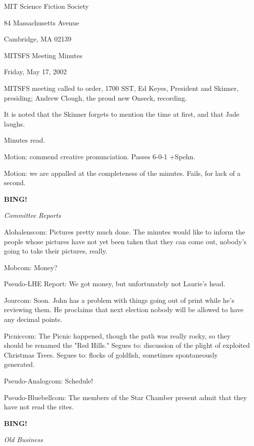 \documentclass[12pt]{article}
\newcommand{\bing}{{\bf BING!} }
\newcommand{\goto}[1]{\bing \vskip 12pt \centerline{{\em{#1}}}}
\begin{document}
\begin{center}

MIT Science Fiction Society 

84 Massachusetts Avenue

Cambridge, MA 02139

\vspace{12pt}

MITSFS Meeting Minutes 

Friday, May 17, 2002

\end{center}
 
\vspace{18pt}

\setlength{\parskip}{6pt}

\noindent
MITSFS meeting called to order, 1700 SST, Ed Keyes, President and Skinner, presiding; Andrew Clough, the proud new Onseck, recording.

It is noted that the Skinner forgets to mention the time at first, and that Jade laughs.

Minutes read.

Motion: commend creative pronunciation. Passes 6-0-1 +Spehn.

Motion: we are appalled at the completeness of the minutes. Fails, for lack of a second.

\goto{Committee Reports}

Alohalenscom: Pictures pretty much done. The minutes would like to inform the people whose pictures have not yet been taken that they can come out, nobody's going to take their pictures, really.

Mobcom: Money?

Pseudo-LHE Report: We got money, but unfortunately not Laurie's head.

Jourcom: Soon. John has a problem with things going out of print while he's reviewing them. He proclaims that next election nobody will be allowed to have any decimal points.

Picniccom: The Picnic happened, though the path was really rocky, so they should be renamed the "Red Hills." Segues to: discussion of the plight of exploited Christmas Trees. Segues to: flocks of goldfish, sometimes spontaneously generated.

Pseudo-Analogcom: Schedule!

Pseudo-Bluebellcom: The members of the Star Chamber present admit that they have not read the rites.

\goto{Old Business}
\end{document}
